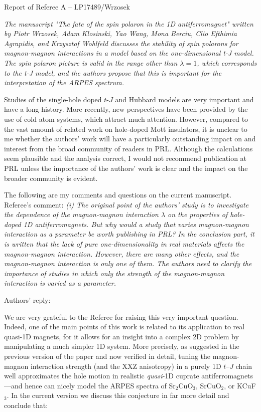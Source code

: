 \documentclass[%
 manuscript,
 amsmath,amssymb,
 aps, onecolumn,
prl,
]{revtex4-1}
\begin{document}
Report of Referee A -- LP17489/Wrzosek

{\it \color{blue}The manuscript "The fate of the spin polaron in the 1D
antiferromagnet" written by Piotr Wrzosek, Adam Klosinski, Yao Wang,
Mona Berciu, Clio Efthimia Agrapidis, and Krzysztof Wohlfeld discusses
the stability of spin polarons for magnon-magnon interactions in a
model based on the one-dimensional t-J model. The spin polaron picture
is valid in the range other than $\lambda=1$, which corresponds to the
t-J model, and the authors propose that this is important for the
interpretation of the ARPES spectrum.

Studies of the single-hole doped $t$-$J$ and Hubbard models are very
important and have a long history. More recently, new perspectives
have been provided by the use of cold atom systems, which attract much
attention. However, compared to the vast amount of related work on
hole-doped Mott insulators, it is unclear to me whether the authors'
work will have a particularly outstanding impact on and interest from
the broad community of readers in PRL. Although the calculations seem
plausible and the analysis correct, I would not recommend publication
at PRL unless the importance of the authors' work is clear and the
impact on the broader community is evident.}

The following are my comments and questions on the current manuscript.
\\

Referee's comment: {\it \color{blue}(i) The original point of the authors' study is to investigate the
dependence of the magnon-magnon interaction $\lambda$ on the properties
of hole-doped 1D antiferromagnets. But why would a study that varies
magnon-magnon interaction as a parameter be worth publishing in PRL?
In the conclusion part, it is written that the lack of pure
one-dimensionality in real materials affects the magnon-magnon
interaction. However, there are many other effects, and the
magnon-magnon interaction is only one of them. The authors need to
clarify the importance of studies in which only the strength of the
magnon-magnon interaction is varied as a parameter.}

Authors' reply:

We are very grateful to the Referee for raising this very important question. Indeed, one of the main points of this work is related to its application to real quasi-1D magnets, for it allows for an insight into a complex 2D problem by manipulating a much simpler 1D system. More precisely, as suggested in the previous version of the paper and now verified in detail, tuning the magnon-magnon interaction strength (and the XXZ anisotropy) in a purely 1D $t$--$J$ chain well approximates the hole motion in realistic {\it quasi}-1D cuprate antiferromagnets---and hence can nicely model the ARPES spectra of Sr$_2$CuO$_3$, SrCuO$_2$, or KCuF$_3$. In the current version we discuss this conjecture in far more detail and conclude that:
\end{document}
